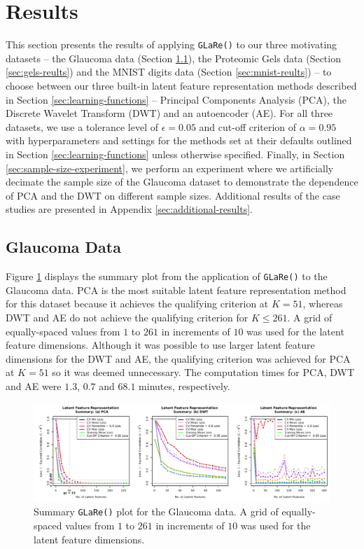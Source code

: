 \section{Results}\label{sec:results}

This section presents the results of applying \texttt{GLaRe()} to our three motivating datasets --  the Glaucoma data (Section \ref{sec:glaucoma-reults}), the Proteomic Gels data (Section \ref{sec:gels-reults}) and the MNIST digits data (Section \ref{sec:mnist-reults}) -- to choose between our three built-in latent feature representation methods described in Section \ref{sec:learning-functions} -- Principal Components Analysis (PCA), the Discrete Wavelet Transform (DWT) and an autoencoder (AE).
For all three datasets, we use a tolerance level of $\epsilon = 0.05$ and cut-off criterion of $\alpha=0.95$ with hyperparameters and settings for the methods set at their defaults outlined in Section \ref{sec:learning-functions} unless otherwise specified.
Finally, in Section \ref{sec:sample-size-experiment}, we perform an experiment where we artificially decimate the sample size of the Glaucoma dataset to demonstrate the dependence of PCA and the DWT on different sample sizes.
Additional results of the case studies are presented in Appendix \ref{sec:additional-results}.

\subsection{Glaucoma Data}\label{sec:glaucoma-reults}

Figure \ref{fig:eye-results} displays the summary plot from the application of \texttt{GLaRe()} to the Glaucoma data.
PCA is the most suitable latent feature representation method for this dataset because it achieves the qualifying criterion at $K=51$, whereas DWT and AE do not achieve the qualifying criterion for $K \leq 261$.
A grid of equally-spaced values from $1$ to $261$ in increments of $10$ was used for the latent feature dimensions.
Although it was possible to use larger latent feature dimensions for the DWT and AE, the qualifying criterion was achieved for PCA at $K=51$ so it was deemed unnecessary.
The computation times for PCA, DWT and AE were $1.3$, $0.7$ and $68.1$ minutes, respectively.


\begin{figure}
    \centering
    \includegraphics[width=1\textwidth]{figures/eye-results.pdf}
    \caption{Summary \texttt{GLaRe()} plot for the Glaucoma data. A grid of equally-spaced values from $1$ to $261$ in increments of $10$ was used for the latent feature dimensions.}
    \label{fig:eye-results}
\end{figure}

